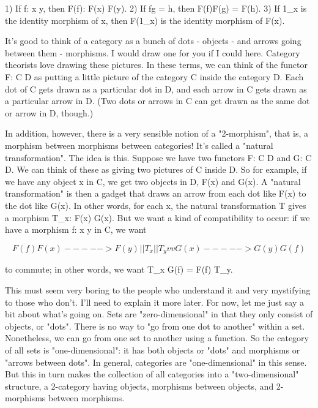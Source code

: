 1) If f: x \to  y, then F(f): F(x) \to  F(y).
2) If fg = h, then F(f)F(g) = F(h). 
3) If 1_{x} is the identity morphism of x, then F(1_{x}) is the identity
   morphism of F(x). 

It's good to think of a category as a bunch of dots - objects - and
arrows going between them - morphisms.  I would draw one for you if I
could here.  Category theorists love drawing these pictures.  In these
terms, we can think of the functor F: C \to  D as putting a little picture
of the category C inside the category D.  Each dot of C gets drawn as a
particular dot in D, and each arrow in C gets drawn as a particular
arrow in D.  (Two dots or arrows in C can get drawn as the same dot or
arrow in D, though.)  


In addition, however, there is a very sensible notion of a
"2-morphism", that is, a morphism between morphisms between
categories!  It's called a "natural transformation".  The idea
is this.  Suppose we have two functors F: C \to  D and G: C \to  D.
We can think of these as giving two pictures of C inside D.  So for
example, if we have any object x in C, we get two objects in D, F(x) and
G(x).  A "natural transformation" is then a gadget that draws
an arrow from each dot like F(x) to the dot like G(x).  In other words,
for each x, the natural transformation T gives a morphism T_{x}:
F(x) \to  G(x).  But we want a kind of compatibility to occur: if we
have a morphism f: x \to  y in C, we want

$$
                               F(f)
                         F(x) -----> F(y)
                      _{ }   |           |
                        T_{x}|           |T_{y}
                          v           v
                         G(x) -----> G(y)
                               G(f)

$$
    
to commute; in other words, we want T_{x} G(f) = F(f) T_{y}.  

This must seem very boring to the people who understand it and very
mystifying to those who don't.  I'll need to explain it more later.  For
now, let me just say a bit about what's going on.  Sets are
"zero-dimensional" in that they only consist of objects, or
"dots".  There is no way to "go from one dot to
another" within a set.  Nonetheless, we can go from one set to
another using a function.  So the category of all sets is
"one-dimensional": it has both objects or "dots" and
morphisms or "arrows between dots".  In general, categories
are "one-dimensional" in this sense.  But this in turn makes
the collection of all categories into a "two-dimensional"
structure, a 2-category having objects, morphisms between objects, and
2-morphisms between morphisms.  

